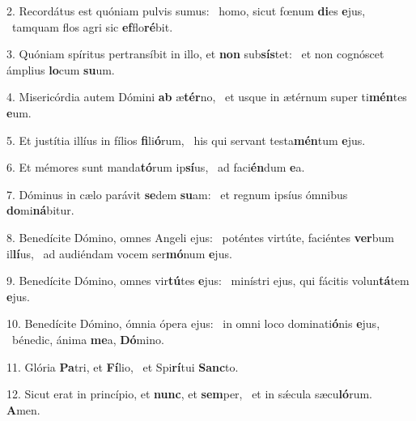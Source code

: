 2. Recordátus est quóniam pulvis sumus: \dag\  homo, sicut fœnum \textbf{di}es \textbf{e}jus, \ast\  tamquam flos agri sic \textbf{ef}flo\textbf{ré}bit.\

3. Quóniam spíritus pertransíbit in illo, et \textbf{non} sub\textbf{sís}tet: \ast\  et non cognóscet ámplius \textbf{lo}cum \textbf{su}um.\

4. Misericórdia autem Dómini \textbf{ab} æ\textbf{tér}no, \ast\  et usque in ætérnum super ti\textbf{mén}tes \textbf{e}um.\

5. Et justítia illíus in fílios \textbf{fi}li\textbf{ó}rum, \ast\  his qui servant testa\textbf{mén}tum \textbf{e}jus.\

6. Et mémores sunt manda\textbf{tó}rum ip\textbf{sí}us, \ast\  ad faci\textbf{én}dum \textbf{e}a.\

7. Dóminus in cælo parávit \textbf{se}dem \textbf{su}am: \ast\  et regnum ipsíus ómnibus \textbf{do}mi\textbf{ná}bitur.\

8. Benedícite Dómino, omnes Angeli ejus: \dag\  poténtes virtúte, faciéntes \textbf{ver}bum il\textbf{lí}us, \ast\  ad audiéndam vocem ser\textbf{mó}num \textbf{e}jus.\

9. Benedícite Dómino, omnes vir\textbf{tú}tes \textbf{e}jus: \ast\  minístri ejus, qui fácitis volun\textbf{tá}tem \textbf{e}jus.\

10. Benedícite Dómino, ómnia ópera ejus: \dag\  in omni loco dominati\textbf{ó}nis \textbf{e}jus, \ast\  bénedic, ánima \textbf{me}a, \textbf{Dó}mino.\

11. Glória \textbf{Pa}tri, et \textbf{Fí}lio, \ast\  et Spi\textbf{rí}tui \textbf{Sanc}to.\

12. Sicut erat in princípio, et \textbf{nunc}, et \textbf{sem}per, \ast\  et in sǽcula sæcu\textbf{ló}rum. \textbf{A}men.\

